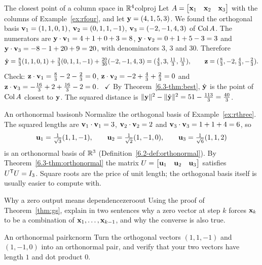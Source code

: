 \documentclass[11pt]{article}
\begin{document}
\begin{exmp}{The closest point of a column space in $\mathbb{R}^4$}{colproj}
Let $A=\begin{bmatrix}\mathbf{x}_1&\mathbf{x}_2&\mathbf{x}_3\end{bmatrix}$ with the columns of Example~\ref{ex:rfour}, and let $\mathbf{y}=(4,1,5,3)$. We found the orthogonal basis $\mathbf{v}_1=(1,1,0,1)$, $\mathbf{v}_2=(0,1,1,-1)$, $\mathbf{v}_3=(-2,-1,4,3)$ of $\operatorname{Col} A$. The numerators are $\mathbf{y}\cdot\mathbf{v}_1=4+1+0+3=8$, $\mathbf{y}\cdot\mathbf{v}_2=0+1+5-3=3$ and $\mathbf{y}\cdot\mathbf{v}_3=-8-1+20+9=20$, with denominators $3$, $3$ and $30$. Therefore
\[
\hat{\mathbf{y}}=\tfrac83(1,1,0,1)+\tfrac33(0,1,1,-1)+\tfrac{20}{30}(-2,-1,4,3)=(\tfrac43,3,\tfrac{11}3,\tfrac{11}3),\qquad\mathbf{z}=(\tfrac83,-2,\tfrac43,-\tfrac23).
\]
Check: $\mathbf{z}\cdot\mathbf{v}_1=\tfrac83-2-\tfrac23=0$, $\mathbf{z}\cdot\mathbf{v}_2=-2+\tfrac43+\tfrac23=0$ and $\mathbf{z}\cdot\mathbf{v}_3=-\tfrac{16}3+2+\tfrac{16}3-2=0$. \ $\checkmark$ By Theorem~\ref{6.3-thm:best}, $\hat{\mathbf{y}}$ is the point of $\operatorname{Col} A$ closest to $\mathbf{y}$. The squared distance is $\lVert\mathbf{y}\rVert^2-\lVert\hat{\mathbf{y}}\rVert^2=51-\tfrac{113}3=\tfrac{40}3$.
\end{exmp}

\begin{exmp}{An orthonormal basis}{onb}
Normalize the orthogonal basis of Example~\ref{ex:rthree}. The squared lengths are $\mathbf{v}_1\cdot\mathbf{v}_1=3$, $\mathbf{v}_2\cdot\mathbf{v}_2=2$ and $\mathbf{v}_3\cdot\mathbf{v}_3=1+1+4=6$, so
\[
\mathbf{u}_1=\tfrac1{\sqrt3}(1,1,-1),\qquad\mathbf{u}_2=\tfrac1{\sqrt2}(1,-1,0),\qquad\mathbf{u}_3=\tfrac1{\sqrt6}(1,1,2)
\]
is an orthonormal basis of $\mathbb{R}^3$ (Definition~\ref{6.2-def:orthonormal}). By Theorem~\ref{6.3-thm:orthonormal} the matrix $U=\begin{bmatrix}\mathbf{u}_1&\mathbf{u}_2&\mathbf{u}_3\end{bmatrix}$ satisfies $U^{\mathsf T} U=I_3$. Square roots are the price of unit length; the orthogonal basis itself is usually easier to compute with.
\end{exmp}

\begin{think}{Why a zero output means dependence}{zeroout}
Using the proof of Theorem~\ref{thm:gs}, explain in two sentences why a zero vector at step $k$ forces $\mathbf{x}_k$ to be a combination of $\mathbf{x}_1,\dots,\mathbf{x}_{k-1}$, and why the converse is also true.
\end{think}

\begin{kc}{An orthonormal pair}{kcnorm}
Turn the orthogonal vectors $(1,1,-1)$ and $(1,-1,0)$ into an orthonormal pair, and verify that your two vectors have length $1$ and dot product $0$.
\end{kc}
\end{document}

